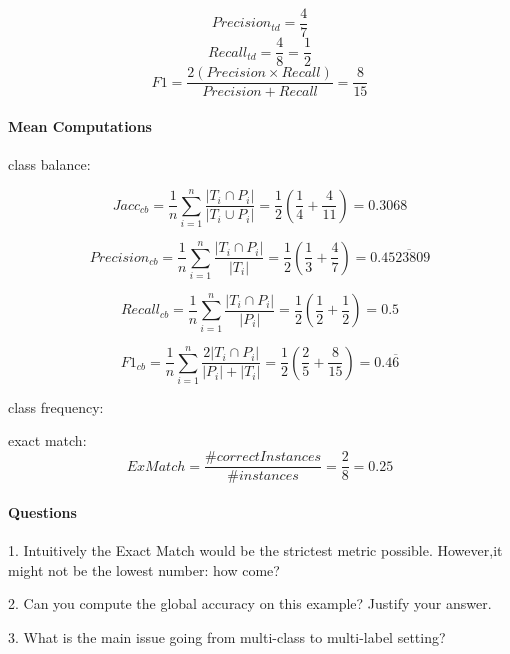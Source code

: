 \documentclass[10pt]{article}
\begin{document}
$$Precision_{td} = \frac{4}{7}$$
$$Recall_{td} = \frac{4}{8} = \frac{1}{2}$$
$$F1 = \frac{2(Precision\times Recall)}{Precision + Recall} = \frac{8}{15}$$

\paragraph{Mean Computations\\}

class balance:

 $$Jacc_{cb} =\frac{1}{n}\sum_{i=1}^{n} \frac{|{T_i}\cap{P_i}|}{|{T_i}\cup{P_i}|} = \frac{1}{2}\left(\frac{1}{4}+\frac{4}{11}\right)= 0.3068$$
 
$$Precision_{cb} =\frac{1}{n}\sum_{i=1}^{n} \frac{|{T_i}\cap{P_i}|}{|T_i|}= \frac{1}{2}\left(\frac{1}{3}+\frac{4}{7}\right) = 0.4\overline{523809}$$

$$Recall_{cb} =\frac{1}{n}\sum_{i=1}^{n} \frac{|{T_i}\cap{P_i}|}{|P_i|} = \frac{1}{2} \left(\frac{1}{2} + \frac{1}{2}\right) = 0.5$$
 
$$F1_{cb} =\frac{1}{n}\sum_{i=1}^{n} \frac{2|{T_i}\cap{P_i}|}{|P_i|+|T_i|} = \frac{1}{2}\left(\frac{2}{5}+\frac{8}{15}\right) = 0.4\overline{6}$$

class frequency:

exact match:
$$ ExMatch = \frac{\#correct Instances}{\# instances} = \frac{2}{8} = 0.25 $$

\paragraph{Questions\\}

1. Intuitively the Exact Match would be the strictest metric possible. However,it might not be the lowest number: how come?

2. Can you compute the global accuracy on this example? Justify your answer.

3. What is the main issue going from multi-class to multi-label setting?
   
\end{document}
